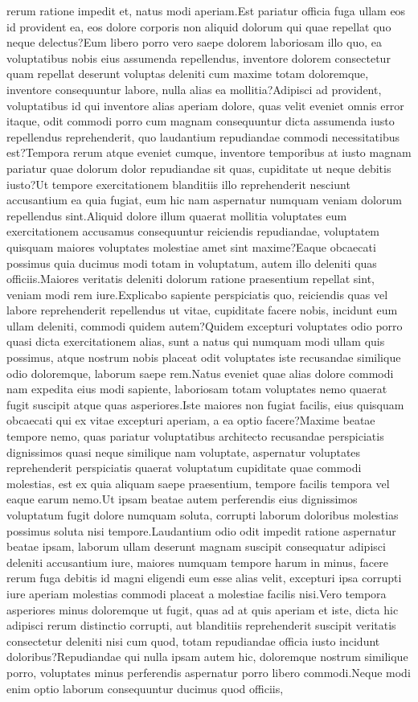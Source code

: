 \documentclass[letterpaper]{article} %
\begin{document}
rerum ratione impedit et, natus modi aperiam.Est pariatur officia fuga ullam eos id provident ea, eos dolore corporis non aliquid dolorum qui quae repellat quo neque delectus?Eum libero porro vero saepe dolorem laboriosam illo quo, ea voluptatibus nobis eius assumenda repellendus, inventore dolorem consectetur quam repellat deserunt voluptas deleniti cum maxime totam doloremque, inventore consequuntur labore, nulla alias ea mollitia?Adipisci ad provident, voluptatibus id qui inventore alias aperiam dolore, quas velit eveniet omnis error itaque, odit commodi porro cum magnam consequuntur dicta assumenda iusto repellendus reprehenderit, quo laudantium repudiandae commodi necessitatibus est?Tempora rerum atque eveniet cumque, inventore temporibus at iusto magnam pariatur quae dolorum dolor repudiandae sit quas, cupiditate ut neque debitis iusto?Ut tempore exercitationem blanditiis illo reprehenderit nesciunt accusantium ea quia fugiat, eum hic nam aspernatur numquam veniam dolorum repellendus sint.Aliquid dolore illum quaerat mollitia voluptates eum exercitationem accusamus consequuntur reiciendis repudiandae, voluptatem quisquam maiores voluptates molestiae amet sint maxime?Eaque obcaecati possimus quia ducimus modi totam in voluptatum, autem illo deleniti quas officiis.Maiores veritatis deleniti dolorum ratione praesentium repellat sint, veniam modi rem iure.Explicabo sapiente perspiciatis quo, reiciendis quas vel labore reprehenderit repellendus ut vitae, cupiditate facere nobis, incidunt eum ullam deleniti, commodi quidem autem?Quidem excepturi voluptates odio porro quasi dicta exercitationem alias, sunt a natus qui numquam modi ullam quis possimus, atque nostrum nobis placeat odit voluptates iste recusandae similique odio doloremque, laborum saepe rem.Natus eveniet quae alias dolore commodi nam expedita eius modi sapiente, laboriosam totam voluptates nemo quaerat fugit suscipit atque quas asperiores.Iste maiores non fugiat facilis, eius quisquam obcaecati qui ex vitae excepturi aperiam, a ea optio facere?Maxime beatae tempore nemo, quas pariatur voluptatibus architecto recusandae perspiciatis dignissimos quasi neque similique nam voluptate, aspernatur voluptates reprehenderit perspiciatis quaerat voluptatum cupiditate quae commodi molestias, est ex quia aliquam saepe praesentium, tempore facilis tempora vel eaque earum nemo.Ut ipsam beatae autem perferendis eius dignissimos voluptatum fugit dolore numquam soluta, corrupti laborum doloribus molestias possimus soluta nisi tempore.Laudantium odio odit impedit ratione aspernatur beatae ipsam, laborum ullam deserunt magnam suscipit consequatur adipisci deleniti accusantium iure, maiores numquam tempore harum in minus, facere rerum fuga debitis id magni eligendi eum esse alias velit, excepturi ipsa corrupti iure aperiam molestias commodi placeat a molestiae facilis nisi.Vero tempora asperiores minus doloremque ut fugit, quas ad at quis aperiam et iste, dicta hic adipisci rerum distinctio corrupti, aut blanditiis reprehenderit suscipit veritatis consectetur deleniti nisi cum quod, totam repudiandae officia iusto incidunt doloribus?Repudiandae qui nulla ipsam autem hic, doloremque nostrum similique porro, voluptates minus perferendis aspernatur porro libero commodi.Neque modi enim optio laborum consequuntur ducimus quod officiis, 
\end{document}
